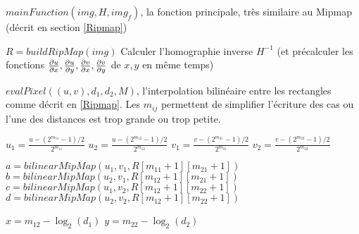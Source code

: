 \medbreak
\medbreak
\begin{algorithm}[H]
\caption{$mainFunction(img,H,img_f)$, la fonction principale, très similaire au Mipmap (décrit en section \ref{Ripmap})}
$R = buildRipMap(img)$\;
Calculer l'homographie inverse $H^{-1}$ (et précalculer les fonctions $\frac{\partial u}{\partial x},\frac{\partial u}{\partial y},\frac{\partial v}{\partial x},\frac{\partial v}{\partial y}$ de $x,y$ en même temps)\;
\end{algorithm}

\medbreak
\medbreak
\medbreak
\medbreak

\begin{algorithm}[H]
\caption{$evalPixel((u,v),d_1,d_2,M)$, l'interpolation bilinéaire entre les rectangles comme décrit en \ref{Ripmap}.
Les $m_{ij}$ permettent de simplifier l'écriture des cas ou l'une des distances est trop grande ou trop petite.}
\label{interbibi1}
$u_1=\frac{u-(2^{m_{11}}-1)/2}{2^{m_{11}}}$\;
$u_2=\frac{u-(2^{m_{12}}-1)/2}{2^{m_{12}}}$\;
$v_1=\frac{v-(2^{m_{21}}-1)/2}{2^{m_{21}}}$\;
$v_2=\frac{v-(2^{m_{22}}-1)/2}{2^{m_{22}}}$\;

$a=bilinearMipMap(u_1,v_1,R[m_{11}+1][m_{21}+1])$\;
$b=bilinearMipMap(u_2,v_1,R[m_{12}+1][m_{21}+1])$\;
$c=bilinearMipMap(u_1,v_2,R[m_{12}+1][m_{22}+1])$\;
$d=bilinearMipMap(u_2,v_2,R[m_{12}+1][m_{22}+1])$\;

$x = m_{12} - \log_2(d_1)$\;
$y = m_{22} - \log_2(d_2)$\;

\end{algorithm}



